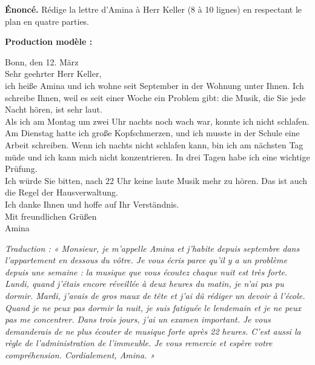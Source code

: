 \documentclass[11pt]{article}
\begin{document}
\begin{exoresolu}
\textbf{Énoncé.} Rédige la lettre d'Amina à Herr Keller (8 à 10 lignes) en respectant le plan en quatre parties.

\tcblower

\textbf{Production modèle :}

Bonn, den 12. März\\
Sehr geehrter Herr Keller,\\
ich heiße Amina und ich wohne seit September in der Wohnung unter Ihnen. Ich schreibe Ihnen, weil es seit einer Woche ein Problem gibt: die Musik, die Sie jede Nacht hören, ist sehr laut.\\
Als ich am Montag um zwei Uhr nachts noch wach war, konnte ich nicht schlafen. Am Dienstag hatte ich große Kopfschmerzen, und ich musste in der Schule eine Arbeit schreiben. Wenn ich nachts nicht schlafen kann, bin ich am nächsten Tag müde und ich kann mich nicht konzentrieren. In drei Tagen habe ich eine wichtige Prüfung.\\
Ich würde Sie bitten, nach 22 Uhr keine laute Musik mehr zu hören. Das ist auch die Regel der Hausverwaltung.\\
Ich danke Ihnen und hoffe auf Ihr Verständnis.\\
Mit freundlichen Grüßen\\
Amina

\emph{Traduction : « Monsieur, je m'appelle Amina et j'habite depuis septembre dans l'appartement en dessous du vôtre. Je vous écris parce qu'il y a un problème depuis une semaine : la musique que vous écoutez chaque nuit est très forte. Lundi, quand j'étais encore réveillée à deux heures du matin, je n'ai pas pu dormir. Mardi, j'avais de gros maux de tête et j'ai dû rédiger un devoir à l'école. Quand je ne peux pas dormir la nuit, je suis fatiguée le lendemain et je ne peux pas me concentrer. Dans trois jours, j'ai un examen important. Je vous demanderais de ne plus écouter de musique forte après 22 heures. C'est aussi la règle de l'administration de l'immeuble. Je vous remercie et espère votre compréhension. Cordialement, Amina. »}


\end{exoresolu}
\end{document}
